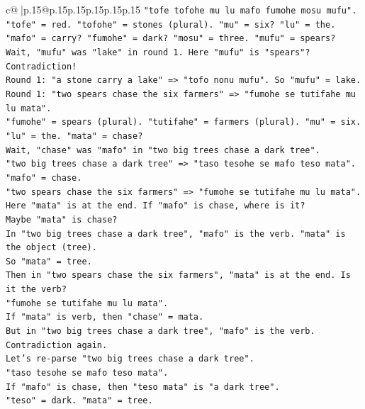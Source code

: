 \documentclass{article}
\begin{document}
{\begin{supertabular}{c@{$\;$}|p{.15\linewidth}@{}p{.15\linewidth}p{.15\linewidth}p{.15\linewidth}p{.15\linewidth}p{.15\linewidth}}
{{{\texttt{"tofe tofohe mu lu mafo fumohe mosu mufu".} \\
\texttt{"tofe" = red. "tofohe" = stones (plural). "mu" = six? "lu" = the.} \\
\texttt{"mafo" = carry? "fumohe" = dark? "mosu" = three. "mufu" = spears?} \\
\texttt{Wait, "mufu" was "lake" in round 1. Here "mufu" is "spears"?} \\
\texttt{Contradiction!} \\
\texttt{Round 1: "a stone carry a lake" => "tofo nonu mufu". So "mufu" = lake.} \\
\texttt{Round 1: "two spears chase the six farmers" => "fumohe se tutifahe mu lu mata".} \\
\texttt{"fumohe" = spears (plural). "tutifahe" = farmers (plural). "mu" = six. "lu" = the. "mata" = chase?} \\
\texttt{Wait, "chase" was "mafo" in "two big trees chase a dark tree".} \\
\texttt{"two big trees chase a dark tree" => "taso tesohe se mafo teso mata".} \\
\texttt{"mafo" = chase.} \\
\texttt{"two spears chase the six farmers" => "fumohe se tutifahe mu lu mata".} \\
\texttt{Here "mata" is at the end. If "mafo" is chase, where is it?} \\
\texttt{Maybe "mata" is chase?} \\
\texttt{In "two big trees chase a dark tree", "mafo" is the verb. "mata" is the object (tree).} \\
\texttt{So "mata" = tree.} \\
\texttt{Then in "two spears chase the six farmers", "mata" is at the end. Is it the verb?} \\
\texttt{"fumohe se tutifahe mu lu mata".} \\
\texttt{If "mata" is verb, then "chase" = mata.} \\
\texttt{But in "two big trees chase a dark tree", "mafo" is the verb.} \\
\texttt{Contradiction again.} \\
\texttt{Let's re{-}parse "two big trees chase a dark tree".} \\
\texttt{"taso tesohe se mafo teso mata".} \\
\texttt{If "mafo" is chase, then "teso mata" is "a dark tree".} \\
\texttt{"teso" = dark. "mata" = tree.} \\
}}}
\end{supertabular}}
\end{document}
